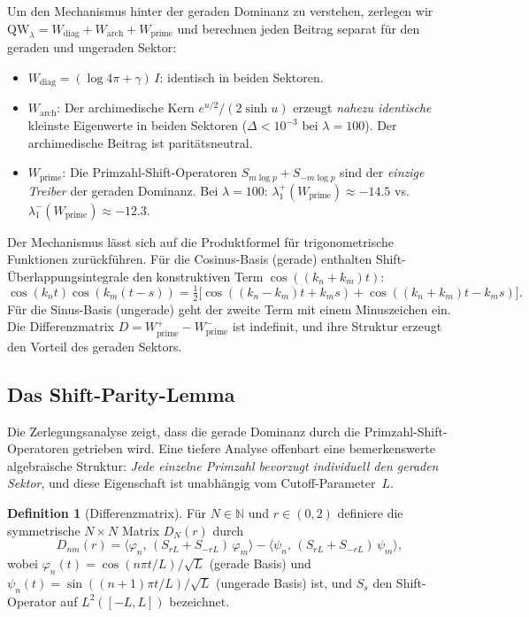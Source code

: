 \documentclass[12pt,a4paper]{article}
\theoremstyle{definition}
\newtheorem{definition}[theorem]{Definition}
\theoremstyle{remark}
\begin{document}
Um den Mechanismus hinter der geraden Dominanz zu verstehen, zerlegen wir $\mathrm{QW}_\lambda = W_{\mathrm{diag}} + W_{\mathrm{arch}} + W_{\mathrm{prime}}$ und berechnen jeden Beitrag separat für den geraden und ungeraden Sektor:

\begin{itemize}
  \item $W_{\mathrm{diag}} = (\log 4\pi + \gamma)\,I$: identisch in beiden Sektoren.
  \item $W_{\mathrm{arch}}$: Der archimedische Kern $e^{u/2}/(2\sinh u)$ erzeugt \emph{nahezu identische} kleinste Eigenwerte in beiden Sektoren ($\Delta < 10^{-3}$ bei $\lambda = 100$). Der archimedische Beitrag ist paritätsneutral.
  \item $W_{\mathrm{prime}}$: Die Primzahl-Shift-Operatoren $S_{m\log p} + S_{-m\log p}$ sind der \emph{einzige Treiber} der geraden Dominanz. Bei $\lambda = 100$: $\lambda_1^+(W_{\mathrm{prime}}) \approx -14.5$ vs.\ $\lambda_1^-(W_{\mathrm{prime}}) \approx -12.3$.
\end{itemize}

Der Mechanismus lässt sich auf die Produktformel für trigonometrische Funktionen zurückführen. Für die Cosinus-Basis (gerade) enthalten Shift-Überlappungsintegrale den konstruktiven Term $\cos((k_n + k_m)t)$:
\[
  \cos(k_n t)\cos(k_m(t-s)) = \tfrac{1}{2}\bigl[\cos((k_n-k_m)t + k_m s) + \cos((k_n+k_m)t - k_m s)\bigr].
\]
Für die Sinus-Basis (ungerade) geht der zweite Term mit einem Minuszeichen ein. Die Differenzmatrix $D = W_{\mathrm{prime}}^+ - W_{\mathrm{prime}}^-$ ist indefinit, und ihre Struktur erzeugt den Vorteil des geraden Sektors.


\subsection{Das Shift-Parity-Lemma}
\label{sec:shift-parity}

Die Zerlegungsanalyse zeigt, dass die gerade Dominanz durch die Primzahl-Shift-Operatoren getrieben wird. Eine tiefere Analyse offenbart eine bemerkenswerte algebraische Struktur: \emph{Jede einzelne Primzahl bevorzugt individuell den geraden Sektor}, und diese Eigenschaft ist unabhängig vom Cutoff-Parameter~$L$.

\begin{definition}[Differenzmatrix]
\label{def:D-matrix}
Für $N \in \mathbb{N}$ und $r \in (0,2)$ definiere die symmetrische $N \times N$ Matrix $D_N(r)$ durch
\[
  D_{nm}(r) = \langle \varphi_n,\, (S_{rL} + S_{-rL})\,\varphi_m \rangle
            - \langle \psi_n,\, (S_{rL} + S_{-rL})\,\psi_m \rangle,
\]
wobei $\varphi_n(t) = \cos(n\pi t/L)/\sqrt{L}$ (gerade Basis) und $\psi_n(t) = \sin((n+1)\pi t/L)/\sqrt{L}$ (ungerade Basis) ist, und $S_s$ den Shift-Operator auf $L^2([-L,L])$ bezeichnet.
\end{definition}
\end{document}
